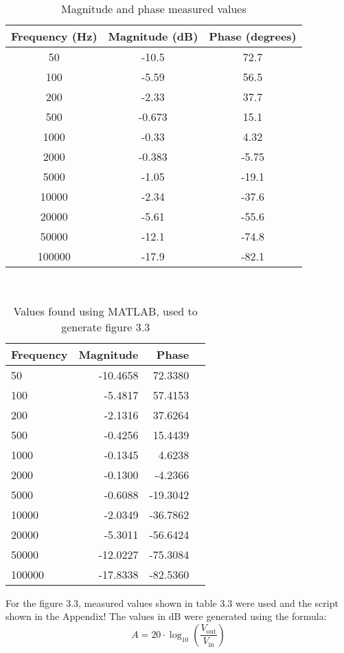 \documentclass[12pt]{report}
\begin{document}
\begin{table}[!htp]
\centering
\begin{tabular}{|c|c|c|}
\hline
\textbf{Frequency (Hz)} & \textbf{Magnitude (dB)} & \textbf{Phase (degrees)} \\
\hline
50 & -10.5 & 72.7 \\
\hline
100 & -5.59 & 56.5 \\
\hline
200 & -2.33 & 37.7 \\
\hline
500 & -0.673 & 15.1 \\
\hline
1000 & -0.33 & 4.32 \\
\hline
2000 & -0.383 & -5.75 \\
\hline
5000 & -1.05 & -19.1 \\
\hline
10000 & -2.34 & -37.6 \\
\hline
20000 & -5.61 & -55.6 \\
\hline
50000 & -12.1 & -74.8 \\
\hline
100000 & -17.9 & -82.1 \\
\hline
\end{tabular}\\
\caption{Magnitude and phase measured values}
\label{tab:mag_phase_response}
\end{table}
\begin{table}[!htp]\centering
\begin{tabular}{lrrr}\toprule
Frequency &Magnitude &Phase \\\midrule
50 &-10.4658 &72.3380 \\
100 &-5.4817 &57.4153 \\
200 &-2.1316 &37.6264 \\
500 &-0.4256 &15.4439 \\
1000 &-0.1345 &4.6238 \\
2000 &-0.1300 &-4.2366 \\
5000 &-0.6088 &-19.3042 \\
10000 &-2.0349 &-36.7862 \\
20000 &-5.3011 &-56.6424 \\
50000 &-12.0227 &-75.3084 \\
100000 &-17.8338 &-82.5360 \\
\bottomrule
\end{tabular}
\caption{Values found using MATLAB, used to generate figure 3.3}\label{tab: }
\end{table}
\newpage
For the figure 3.3, measured values shown in table 3.3 were used and the script shown in the Appendix! The values in dB were generated using the formula:
$$ A = 20 \cdot \log_{10} \left( \frac{V_{\text{out}}}{V_{\text{in}}} \right) $$
\end{document}
